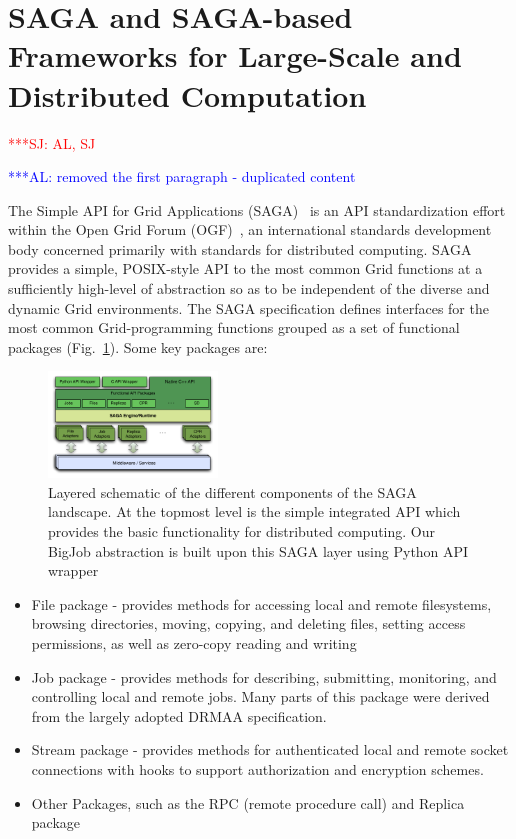 \documentclass[conference,final]{IEEEtran}
\newcommand{\alnote}[1]{ {\textcolor{blue} { ***AL: #1 }}}
\newcommand{\jhanote}[1]{ {\textcolor{red} { ***SJ: #1 }}}
\newcommand{\alnote}[1]{}
\newcommand{\jhanote}[1]{}
\begin{document}
\section{SAGA and SAGA-based Frameworks for Large-Scale and
  Distributed Computation} \jhanote{AL, SJ}

\alnote{removed the first paragraph - duplicated content}

The Simple API for Grid Applications (SAGA)~\cite{saga_url}  is an API standardization
effort within the Open Grid Forum (OGF)~\cite{saga_gfd90}, an
international standards development body concerned primarily with
standards for distributed computing. SAGA provides a simple,
POSIX-style API to the most common Grid functions at a sufficiently
high-level of abstraction so as to be independent of the diverse and
dynamic Grid environments. The SAGA specification defines interfaces
for the most common Grid-programming functions grouped as a set of
functional packages (Fig.~\ref{Fig:SAGA1}). Some key packages are:

\begin{figure}[!ht]
 \begin{center}
     \includegraphics[width=0.40\textwidth]{stci_saga_figures-1.pdf}
 \end{center}
\caption{\small Layered schematic of the different components of the
   SAGA landscape. At the topmost level is the simple integrated API
   which provides the basic functionality for distributed
   computing. Our BigJob abstraction is built upon this SAGA layer
   using Python API wrapper} \label{Fig:SAGA1}
\end{figure}

\begin{itemize}
\item File package - provides methods for accessing local and remote
 filesystems, browsing directories, moving, copying, and deleting
 files, setting access permissions, as well as zero-copy reading and
 writing
\item Job package - provides methods for describing, submitting,
 monitoring, and controlling local and remote jobs. Many parts of
 this package were derived from the largely adopted
 DRMAA %
 specification.
\item Stream package - provides methods for authenticated local and
 remote socket connections with hooks to support authorization and
 encryption schemes.
\item Other Packages, such as the RPC (remote procedure call) and Replica
 package
\end{itemize}
\end{document}
